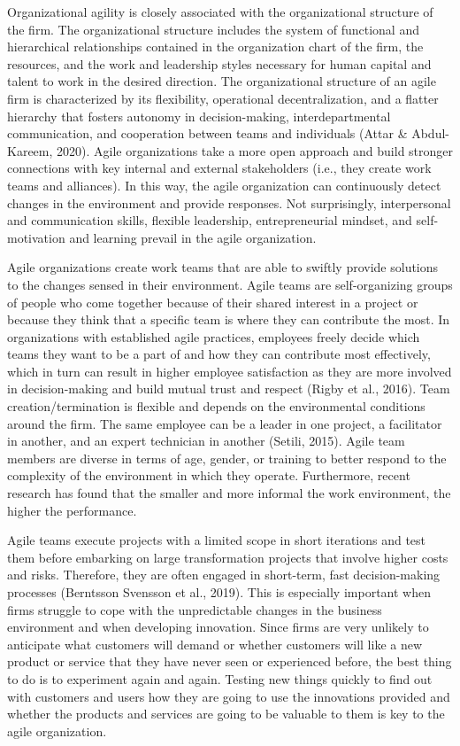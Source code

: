 \documentclass[
  letterpaper,
  DIV=11,
  numbers=noendperiod]{scrreprt}
\begin{document}
Organizational agility is closely associated with the organizational
structure of the firm. The organizational structure includes the system
of functional and hierarchical relationships contained in the
organization chart of the firm, the resources, and the work and
leadership styles necessary for human capital and talent to work in the
desired direction. The organizational structure of an agile firm is
characterized by its flexibility, operational decentralization, and a
flatter hierarchy that fosters autonomy in decision-making,
interdepartmental communication, and cooperation between teams and
individuals (Attar \& Abdul-Kareem, 2020). Agile organizations take a
more open approach and build stronger connections with key internal and
external stakeholders (i.e., they create work teams and alliances). In
this way, the agile organization can continuously detect changes in the
environment and provide responses. Not surprisingly, interpersonal and
communication skills, flexible leadership, entrepreneurial mindset, and
self-motivation and learning prevail in the agile organization.

Agile organizations create work teams that are able to swiftly provide
solutions to the changes sensed in their environment. Agile teams are
self-organizing groups of people who come together because of their
shared interest in a project or because they think that a specific team
is where they can contribute the most. In organizations with established
agile practices, employees freely decide which teams they want to be a
part of and how they can contribute most effectively, which in turn can
result in higher employee satisfaction as they are more involved in
decision-making and build mutual trust and respect (Rigby et al., 2016).
Team creation/termination is flexible and depends on the environmental
conditions around the firm. The same employee can be a leader in one
project, a facilitator in another, and an expert technician in another
(Setili, 2015). Agile team members are diverse in terms of age, gender,
or training to better respond to the complexity of the environment in
which they operate. Furthermore, recent research has found that the
smaller and more informal the work environment, the higher the
performance.

Agile teams execute projects with a limited scope in short iterations
and test them before embarking on large transformation projects that
involve higher costs and risks. Therefore, they are often engaged in
short-term, fast decision-making processes (Berntsson Svensson et al.,
2019). This is especially important when firms struggle to cope with the
unpredictable changes in the business environment and when developing
innovation. Since firms are very unlikely to anticipate what customers
will demand or whether customers will like a new product or service that
they have never seen or experienced before, the best thing to do is to
experiment again and again. Testing new things quickly to find out with
customers and users how they are going to use the innovations provided
and whether the products and services are going to be valuable to them
is key to the agile organization.
\end{document}

